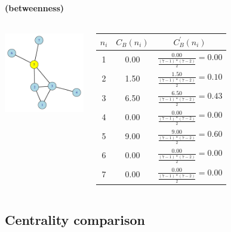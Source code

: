 \documentclass[8pt]{beamer}
\begin{document}
\begin{frame}
\frametitle{\insertsection}
\framesubtitle{\insertsubsection \hspace{0.05cm} (betweenness)}


\begin{columns}
	\centering  
	\includegraphics[width=5cm]{betweenness}
	
	\small
	\renewcommand{\arraystretch}{1.5}
	\begin{table}
	\begin{tabular}{ccc}
		\toprule
	$n_i$ & $C_B(n_i) $ & $C_B^{'}(n_i)$\\
	\hline
	1 & 0.00 & $\frac{0.00}{\frac{(7-1)*(7-2)}{2}}=0.00$\\
	2 & 1.50 & $\frac{1.50}{\frac{(7-1)*(7-2)}{2}}=0.10$\\
	3 & 6.50 & $\frac{6.50}{\frac{(7-1)*(7-2)}{2}}=0.43$\\
	4 & 0.00 & $\frac{0.00}{\frac{(7-1)*(7-2)}{2}}=0.00$\\
	5 & 9.00 & $\frac{9.00}{\frac{(7-1)*(7-2)}{2}}=0.60$\\
	6 & 0.00 & $\frac{0.00}{\frac{(7-1)*(7-2)}{2}}=0.00$\\
	7 & 0.00 & $\frac{0.00}{\frac{(7-1)*(7-2)}{2}}=0.00$\\
	\bottomrule
	\end{tabular}
	\end{table}
\end{columns}
\end{frame}

\subsection{Centrality comparison}
\end{document}
